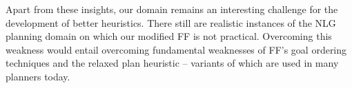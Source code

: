 Apart from these insights, our domain remains an interesting challenge
for the development of better heuristics. There still are realistic
instances of the NLG planning domain on which our modified FF is not
practical. Overcoming this weakness would entail overcoming
fundamental weaknesses of FF's goal ordering techniques and the
relaxed plan heuristic -- variants of which are used in many planners
today.








%



